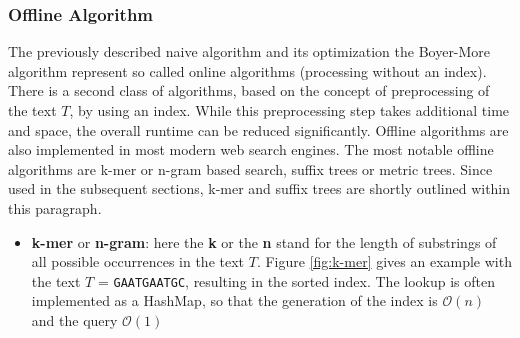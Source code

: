 \subsubsection{Offline Algorithm}
The previously described naive algorithm and its optimization the Boyer-More algorithm represent so called online algorithms (processing without an index). There is a second class of algorithms, based on the concept of preprocessing of the text $T$, by using an index. While this preprocessing step takes additional time and space, the overall runtime can be reduced significantly. Offline algorithms are also implemented in most modern web search engines.  The most notable offline algorithms are  k-mer or n-gram based search, suffix trees or metric trees. Since used in the subsequent sections, k-mer and suffix trees are shortly outlined within this paragraph.
\begin{itemize}
\item \textbf{k-mer} or \textbf{n-gram}: here the \textbf{k} or the \textbf{n} stand for the length of substrings of all possible occurrences in the text $T$. Figure \ref{fig:k-mer} gives an example with the text $T$ = \texttt{GAATGAATGC}, resulting in the sorted index. The lookup is often implemented as a HashMap, so that the generation of the index is $\mathcal{O}({n})$ and the query $\mathcal{O}({1})$

 \begin{minipage}{\linewidth}


\end{minipage}
\end{itemize}
